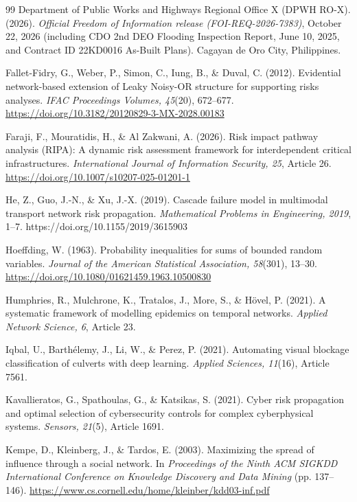 \begin{thebibliography}{99}
Department of Public Works and Highways Regional Office X (DPWH RO-X). (2026). \textit{Official Freedom of Information release (FOI-REQ-2026-7383)}, October 22, 2026 (including CDO 2nd DEO Flooding Inspection Report, June 10, 2025, and Contract ID 22KD0016 As-Built Plans). Cagayan de Oro City, Philippines.

Fallet-Fidry, G., Weber, P., Simon, C., Iung, B., \& Duval, C. (2012). Evidential network-based extension of Leaky Noisy-OR structure for supporting risks analyses. \textit{IFAC Proceedings Volumes, 45}(20), 672--677. \url{https://doi.org/10.3182/20120829-3-MX-2028.00183}

Faraji, F., Mouratidis, H., \& Al Zakwani, A. (2026). Risk impact pathway analysis (RIPA): A dynamic risk assessment framework for interdependent critical infrastructures. \textit{International Journal of Information Security, 25}, Article 26. \url{https://doi.org/10.1007/s10207-025-01201-1}

He, Z., Guo, J.-N., \& Xu, J.-X. (2019). Cascade failure model in multimodal transport network risk propagation. \textit{Mathematical Problems in Engineering, 2019}, 1--7. https://doi.org/10.1155/2019/3615903

Hoeffding, W. (1963). Probability inequalities for sums of bounded random variables. \textit{Journal of the American Statistical Association, 58}(301), 13--30. \url{https://doi.org/10.1080/01621459.1963.10500830}

Humphries, R., Mulchrone, K., Tratalos, J., More, S., \& H\"ovel, P. (2021). A systematic framework of modelling epidemics on temporal networks. \textit{Applied Network Science, 6}, Article 23.

Iqbal, U., Barth{\'e}lemy, J., Li, W., \& Perez, P. (2021). Automating visual blockage classification of culverts with deep learning. \textit{Applied Sciences, 11}(16), Article 7561.

Kavallieratos, G., Spathoulas, G., \& Katsikas, S. (2021). Cyber risk propagation and optimal selection of cybersecurity controls for complex cyberphysical systems. \textit{Sensors, 21}(5), Article 1691.

Kempe, D., Kleinberg, J., \& Tardos, E. (2003). Maximizing the spread of influence through a social network. In \textit{Proceedings of the Ninth ACM SIGKDD International Conference on Knowledge Discovery and Data Mining} (pp. 137--146). \url{https://www.cs.cornell.edu/home/kleinber/kdd03-inf.pdf}


\end{thebibliography}
